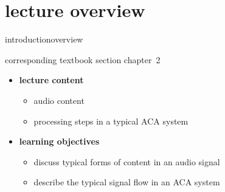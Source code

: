 


\subtitle{Module 2.0: Audio Content Analysis Process}


	

    \section[overview]{lecture overview}
        \begin{frame}{introduction}{overview}
            \begin{block}{corresponding textbook section}
                    chapter~2
            \end{block}
            \vspace{5mm}

            \begin{itemize}
                \item   \textbf{lecture content}
                    \begin{itemize}
                        \item   audio content
                        \item   processing steps in a typical ACA system
                    \end{itemize}
                \bigskip
                \item<2->   \textbf{learning objectives}
                    \begin{itemize}
                        \item   discuss typical forms of content in an audio signal
                        \item   describe the typical signal flow in an ACA system
                    \end{itemize}
            \end{itemize}
        \end{frame}
        

